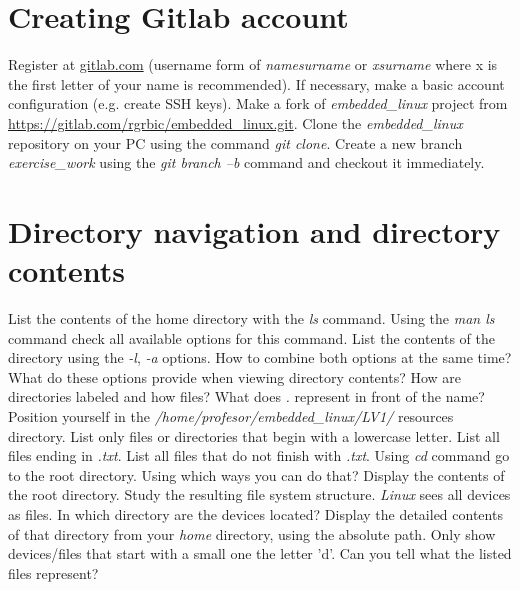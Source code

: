 \documentclass[11pt]{article}
\begin{document}
\section{Creating Gitlab account}
Register at \url{gitlab.com} (username form of \textit{namesurname} or
 \textit{xsurname} where {x} is the first letter of your name is recommended).
 If necessary, make a basic account configuration (e.g. create SSH keys). Make
 a fork of \textit{embedded\_linux} project from
 \url{https://gitlab.com/rgrbic/embedded\_linux.git}.
\newline
\newline
Clone the \textit{embedded\_linux} repository on your PC using the command
 \textit{git clone}. Create a new branch \textit{exercise\_work} using the
 \textit{git branch –b} command and checkout it immediately.

\section{Directory navigation and directory contents}
List the contents of the home directory with the \textit{ls} command. Using
 the \textit{man ls} command check all available options for this command. List
 the contents of the directory using the \textit{-l}, \textit{-a} options.
 How to combine both options at the same time? What do these options provide
 when viewing directory contents? How are directories labeled
 and how files? What does \textit{.} represent in front of the name?
 \newline
 \newline
Position yourself in the \textit{/home/profesor/embedded\_linux/LV1/} resources
 directory. List only files or directories that begin with a lowercase letter.
 List all files ending in \textit{.txt}. List all files that do not finish
 with \textit{.txt}.
\newline
\newline
Using \textit{cd} command go to the root directory. Using which ways you can do
 that? Display the contents of the root directory. Study the resulting file
 system structure.
\newline
\newline
\textit{Linux} sees all devices as files. In which directory are the devices
 located? Display the detailed contents of that directory from your
 \textit{home} directory, using the absolute path. Only show devices/files that
 start with a small one the letter 'd'. Can you tell what the listed files
 represent?
\end{document}
